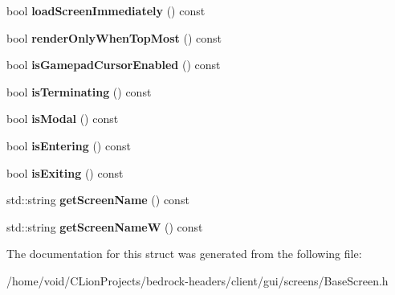 \begin{DoxyCompactItemize}
bool {\bfseries load\+Screen\+Immediately} () const
\item 
\mbox{\label{struct_base_screen_a5c0ea9fcd0414494f35a0773bda67428}} 
bool {\bfseries render\+Only\+When\+Top\+Most} () const
\item 
\mbox{\label{struct_base_screen_ad9d08af020cc34718f09ed9d601461cc}} 
bool {\bfseries is\+Gamepad\+Cursor\+Enabled} () const
\item 
\mbox{\label{struct_base_screen_ab15a9c5d3a9c6b39b5cd4bcb67267a07}} 
bool {\bfseries is\+Terminating} () const
\item 
\mbox{\label{struct_base_screen_a09f23e4cc1bd4f160854b0050b7ec2d3}} 
bool {\bfseries is\+Modal} () const
\item 
\mbox{\label{struct_base_screen_a47e9d87570831f476ee825a97f93f86f}} 
bool {\bfseries is\+Entering} () const
\item 
\mbox{\label{struct_base_screen_ac52cf103d9850aa6f72487acd968c19d}} 
bool {\bfseries is\+Exiting} () const
\item 
\mbox{\label{struct_base_screen_a321c51bbabd142bc912fd7a58a20b3c9}} 
std\+::string {\bfseries get\+Screen\+Name} () const
\item 
\mbox{\label{struct_base_screen_a58fe4cb9fd0bbfc2f250de60d1526989}} 
std\+::string {\bfseries get\+Screen\+NameW} () const
\end{DoxyCompactItemize}


The documentation for this struct was generated from the following file\+:\begin{DoxyCompactItemize}
\item 
/home/void/\+C\+Lion\+Projects/bedrock-\/headers/client/gui/screens/Base\+Screen.\+h\end{DoxyCompactItemize}
